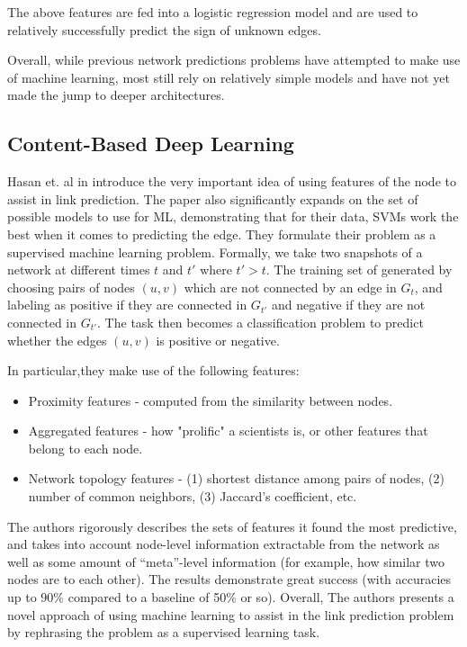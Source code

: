 \documentclass[letterpaper, 11 pt, conference]{ieeeconf}  %
\begin{document}
The above features are fed into a logistic regression model and are used to relatively successfully predict the sign of unknown edges.

Overall, while previous network predictions problems have attempted to make use of machine learning, most still rely on relatively simple models and have not yet made the jump to deeper architectures.

\subsection{Content-Based Deep Learning}
Hasan et. al in \cite{Hasan06linkprediction} introduce the very important idea of using features of the node to assist in link prediction. The paper also significantly expands on the set of possible models to use for ML, demonstrating that for their data, SVMs work the best when it comes to predicting the edge. They formulate their problem as a supervised machine learning problem. Formally, we take two snapshots of a network at different times $t$ and $t'$ where $t' > t$. The training set of generated by choosing pairs of nodes $(u,v)$ which are not connected by an edge in $G_t$, and labeling as positive if they are connected in $G_{t'}$ and negative if they are not connected in $G_{t'}$. The task then becomes a classification problem to predict whether the edges $(u,v)$ is positive or negative. 

In particular,they make use of the following features:

\begin{itemize}
\item Proximity features - computed from the similarity between nodes.
\item Aggregated features - how "prolific" a scientists is, or other features that belong to each node.
\item Network topology features - (1) shortest distance among pairs of nodes, (2) number of common neighbors, (3) Jaccard's coefficient, etc.
\end{itemize}

The authors rigorously describes the sets of features it found the most predictive, and takes into account node-level information extractable from the network as well as some amount of ``meta''-level information (for example, how similar two nodes are to each other). The results demonstrate great success (with accuracies up to 90\% compared to a baseline of 50\% or so). Overall, The authors presents a novel approach of using machine learning to assist in the link prediction problem by rephrasing the problem as a supervised learning task.
\end{document}
